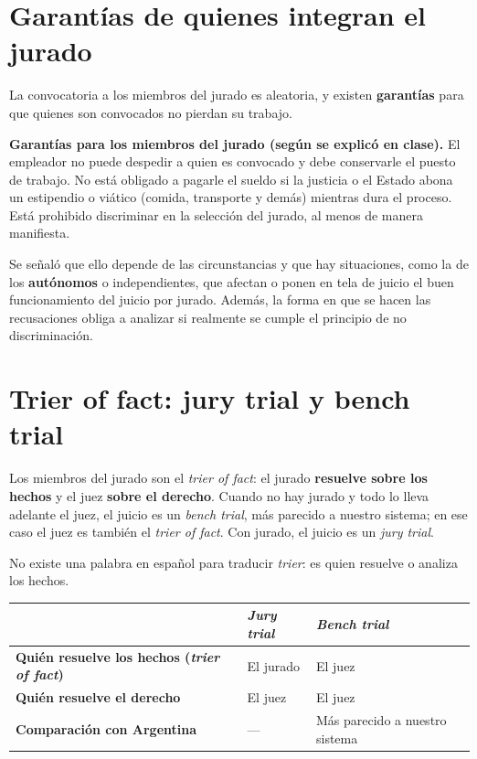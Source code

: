 \documentclass[12pt,oneside]{book}
\begin{document}
\section{Garantías de quienes integran el jurado}

La convocatoria a los miembros del jurado es aleatoria, y existen \textbf{garantías} para que quienes son convocados no pierdan su trabajo.

\begin{important}
\textbf{Garantías para los miembros del jurado (según se explicó en clase).}
El empleador no puede despedir a quien es convocado y debe conservarle el puesto de trabajo. No está obligado a pagarle el sueldo si la justicia o el Estado abona un estipendio o viático (comida, transporte y demás) mientras dura el proceso. Está prohibido discriminar en la selección del jurado, al menos de manera manifiesta.
\end{important}

Se señaló que ello depende de las circunstancias y que hay situaciones, como la de los \textbf{autónomos} o independientes, que afectan o ponen en tela de juicio el buen funcionamiento del juicio por jurado. Además, la forma en que se hacen las recusaciones obliga a analizar si realmente se cumple el principio de no discriminación.

\section{Trier of fact: jury trial y bench trial}

Los miembros del jurado son el \textit{trier of fact}: el jurado \textbf{resuelve sobre los hechos} y el juez \textbf{sobre el derecho}. Cuando no hay jurado y todo lo lleva adelante el juez, el juicio es un \textit{bench trial}, más parecido a nuestro sistema; en ese caso el juez es también el \textit{trier of fact}. Con jurado, el juicio es un \textit{jury trial}.

No existe una palabra en español para traducir \textit{trier}: es quien resuelve o analiza los hechos.

\begin{table}[H]
\centering
\begin{tabularx}{\textwidth}{P{4.4cm}LL}
\toprule
 & \textbf{\textit{Jury trial}} & \textbf{\textit{Bench trial}} \\
\midrule
\textbf{Quién resuelve los hechos (\textit{trier of fact})} & El jurado & El juez \\
\textbf{Quién resuelve el derecho} & El juez & El juez \\
\textbf{Comparación con Argentina} & --- & Más parecido a nuestro sistema \\
\bottomrule
\end{tabularx}
\end{table}
\end{document}

